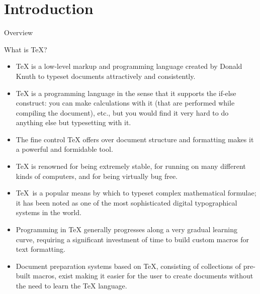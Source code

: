 \documentclass[style=lehigh,orient=landscape]{powerdot}
\begin{document}
\section[slide=false]{Introduction}
\begin{wideslide}[toc=,bm=]{Overview}
  \tableofcontents[content=currentsection,type=0]
\end{wideslide}
\begin{wideslide}[bm={What is \TeX{} \& \LaTeX?}]{What is \TeX{}?}
  \begin{itemize}
  \item \TeX{} is a low-level markup and programming language created by Donald Knuth to typeset documents attractively and consistently.
  \item \TeX{} is a programming language in the sense that it supports the if-else construct: you can make calculations with it (that are performed while compiling the document), etc., but you would find it very hard to do anything else but typesetting with it.
  \item The fine control \TeX{} offers over document structure and formatting makes it a powerful and formidable tool.
  \item \TeX{} is renowned for being extremely stable, for running on many different kinds of computers, and for being virtually bug free.
  \item \TeX\, is a popular means by which to typeset complex mathematical formulae; it has been noted as one of the most sophisticated digital typographical systems in the world.
  \item Programming in \TeX{} generally progresses along a very gradual learning curve, requiring a significant investment of time to build custom macros for text formatting.
  \item Document preparation systems based on \TeX{}, consisting of collections of pre-built macros, exist making it easier for the user to create documents without the need to learn the \TeX{} language.
  \end{itemize}
\end{wideslide}	
\end{document}
